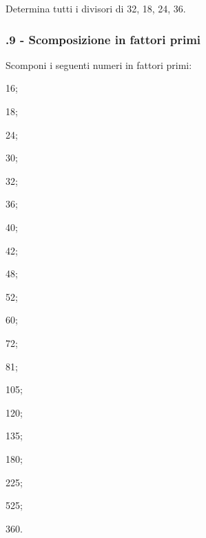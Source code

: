 \begin{esercizio}
\label{ese:1.18}
 Determina tutti i divisori di 32, 18, 24, 36.
\end{esercizio}

\subsubsection*{\thechapter.9 - Scomposizione in fattori primi}

\begin{esercizio}[\Ast]
\label{ese:1.19}
Scomponi i seguenti numeri in fattori primi:
 \begin{multicols}{5}
 \begin{enumeratea}
 \item 16;
 \item 18;
 \item 24;
 \item 30;
 \item 32;
 \item 36;
 \item 40;
 \item 42;
 \item 48;
 \item 52;
 \item 60;
 \item 72;
 \item 81;
 \item 105;
 \item 120;
 \item 135;
 \item 180;
 \item 225;
 \item 525;
 \item 360.
 \end{enumeratea}
 \end{multicols}
\end{esercizio}


